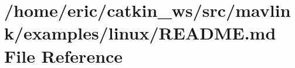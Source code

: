 \hypertarget{mavlink_2examples_2linux_2README_8md}{}\section{/home/eric/catkin\+\_\+ws/src/mavlink/examples/linux/\+R\+E\+A\+D\+ME.md File Reference}
\label{mavlink_2examples_2linux_2README_8md}
